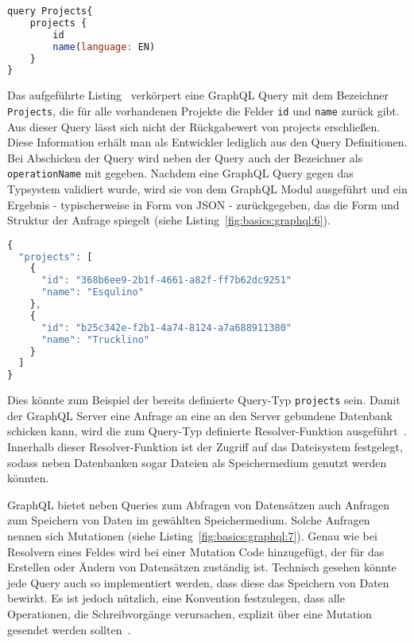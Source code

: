 \begin{lstlisting}[language=Javascript,float=h!,caption={GraphQL Query mit dem Bezeichner Projects}, label={fig:basics:graphql:5}]
query Projects{
    projects {
        id
        name(language: EN)
    }
}
\end{lstlisting}

Das aufgeführte Listing~ verkörpert eine GraphQL Query mit dem Bezeichner \texttt{Projects},
die für alle vorhandenen Projekte die Felder \texttt{id} und \texttt{name} zurück gibt. 
Aus dieser Query lässt sich nicht der Rückgabewert von projects erschließen.
Diese Information erhält man als Entwickler lediglich aus den Query Definitionen.
Bei Abschicken der Query wird neben der Query auch der 
Bezeichner als \texttt{operationName} mit gegeben.
Nachdem eine GraphQL Query gegen das Typsystem validiert wurde, wird sie von dem GraphQL Modul ausgeführt und
ein Ergebnis - typischerweise in Form von JSON - zurückgegeben, das die Form und Struktur der Anfrage spiegelt (siehe Listing~\ref{fig:basics:graphql:6}).

\begin{lstlisting}[language=Javascript,float=h!,caption={JSON Antwort auf die Projects Query}, label={fig:basics:graphql:6}]
{
  "projects": [
    {
      "id": "368b6ee9-2b1f-4661-a82f-ff7b62dc9251"
      "name": "Esqulino"
    },
    {
      "id": "b25c342e-f2b1-4a74-8124-a7a688911380"
      "name": "Trucklino"
    }
  ]
}
\end{lstlisting}

Dies könnte zum Beispiel der bereits definierte Query-Typ \texttt{projects} sein.
Damit der GraphQL Server eine Anfrage an eine an den Server gebundene Datenbank schicken kann, wird die zum Query-Typ definierte
Resolver-Funktion ausgeführt~\cite{graphql-execution}. Innerhalb dieser Resolver-Funktion ist der Zugriff auf das Dateisystem festgelegt, sodass
neben Datenbanken sogar Dateien als Speichermedium genutzt werden könnten.

GraphQL bietet neben Queries zum Abfragen von Datensätzen auch Anfragen zum Speichern von Daten im gewählten Speichermedium. Solche Anfragen nennen sich Mutationen (siehe Listing~\ref{fig:basics:graphql:7}). Genau wie bei Resolvern eines Feldes wird bei einer Mutation Code hinzugefügt, der  für das Erstellen oder Ändern von Datensätzen zuständig ist. Technisch gesehen könnte jede Query auch so implementiert werden, dass diese das Speichern von Daten bewirkt. Es ist jedoch nützlich, eine Konvention festzulegen, dass alle Operationen, die Schreibvorgänge verursachen, explizit über eine Mutation gesendet werden sollten~\cite{graphql-mutations}.

